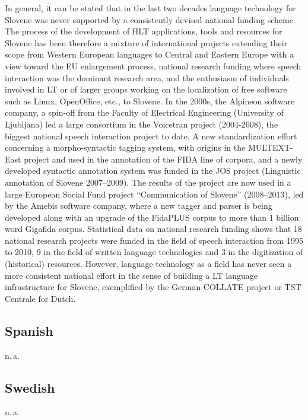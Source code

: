 \documentclass[10pt, plain]{../../metanetpaper}
\begin{document}
\begin{multicols}{2}
In general, it can be stated that in the last two decades language technology for Slovene was never supported by a consistently devised national funding scheme. The process of the development of HLT applications, tools and resources for Slovene has been therefore a mixture of international projects extending their scope from Western European languages to Central and Eastern Europe with a view toward the EU enlargement process, national research funding where speech interaction was the dominant research area, and the enthusiasm of individuals involved in LT or of larger groups working on the localization of free software such as Linux, OpenOffice, etc., to Slovene.  In the 2000s, the Alpineon software company, a spin-off from the Faculty of Electrical Engineering (University of Ljubljana) led a large consortium in the Voicetran project (2004-2008), the biggest national speech interaction project to date.  A new standardization effort concerning a morpho-syntactic tagging system, with origins in the MULTEXT-East project and used in the annotation of the FIDA line of corpora, and a newly developed syntactic annotation system was funded in the JOS project (Linguistic annotation of Slovene 2007--2009). The results of the project are now used in a large European Social Fund project “Communication of Slovene” (2008--2013), led by the Amebis software company, where a new tagger and parser is being developed along with an upgrade of the FidaPLUS corpus to more than 1 billion word Gigafida corpus.  Statistical data on national research funding shows that 18 national research projects were funded in the field of speech interaction from 1995 to 2010, 9 in the field of written language technologies and 3 in the digitization of (historical) resources. However, language technology as a field has never seen a more consistent national effort in the sense of building a LT language infrastructure for Slovene, exemplified by the German COLLATE project or TST Centrale for Dutch.

\subsection*{Spanish}
\label{sec:spanish}

n.\,a.

\subsection*{Swedish}
\label{sec:swedish}

n.\,a.

\end{multicols}


\makespine
\end{document}
